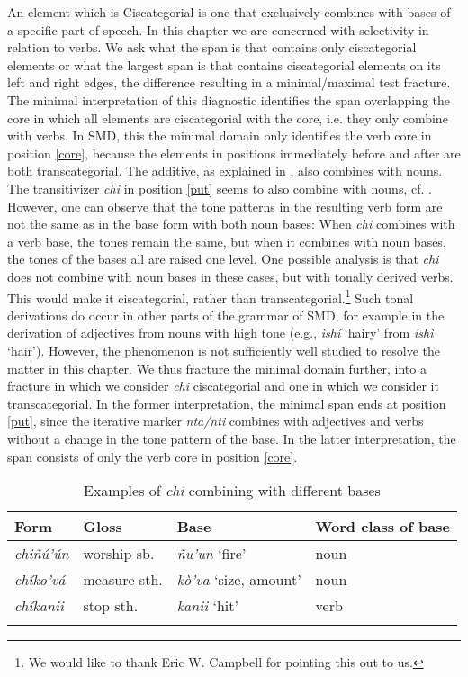 \documentclass[output=paper]{langscibook}
\begin{document}
An element which is Ciscategorial is one that exclusively combines with bases of a specific part of speech. In this chapter we are concerned with selectivity in relation to verbs. 
We ask what the span is that contains only ciscategorial elements or what the largest span is that contains ciscategorial elements on its left and right edges, the difference resulting in a minimal/maximal test fracture. 
The minimal interpretation of this diagnostic identifies the span overlapping the core in which all elements are ciscategorial with the core, i.e. they only combine with verbs. 
In SMD, this the minimal domain only identifies the verb core in position \ref{core}, because the elements in positions immediately before and after are both transcategorial. 
The additive, as explained in   , also combines with nouns.
The transitivizer \textit{chi} in position \ref{put} seems to also combine with nouns, cf. .
However, one can observe that the tone patterns in the resulting verb form are not the same as in the base form with both noun bases: When \textit{chi} combines with a verb base, the tones remain the same, but when it combines with noun bases, the tones of the bases all are raised one level. One possible analysis is that  \textit{chi} does not combine with noun bases in these cases, but with tonally derived verbs. This would make it ciscategorial, rather than transcategorial.\footnote{We would like to thank Eric W. Campbell for pointing this out to us.}
Such tonal derivations do occur in other parts of the grammar of SMD, for example in the derivation of adjectives from nouns with high tone (e.g., \textit{ìshí} `hairy' from \textit{ishì} `hair'). However, the phenomenon is not sufficiently well studied to resolve the matter in this chapter.  
We thus fracture the minimal domain further, into a fracture in which we consider \textit{chi} ciscategorial and one in which we consider it transcategorial.
In the former interpretation, the minimal span ends at position \ref{put}, since the iterative marker \textit{nta/nti} combines with adjectives and verbs without a change in the tone pattern of the base. 
In the latter interpretation, the span consists of only the verb core in position \ref{core}.

\begin{table}
\caption{Examples of \textit{chi} combining with different bases}
\label{tab:transcategorial}
    \begin{tabularx}{\textwidth}{XXll} \lsptoprule
    \textbf{Form}                & \textbf{Gloss}  & \textbf{Base} & \textbf{Word class of base} \\ 
    \midrule
    \textit{chiñú'ún}   & worship sb.    & \textit{ñu'un}  `fire' & noun \\
    \textit{chíko'vá}    & measure sth.  & \textit{kò'va} `size, amount'   & noun \\
    \textit{chíkanii}   & stop sth.       & \textit{kanii} `hit' & verb \\
    \lspbottomrule
    \end{tabularx}
\end{table}
\end{document}
